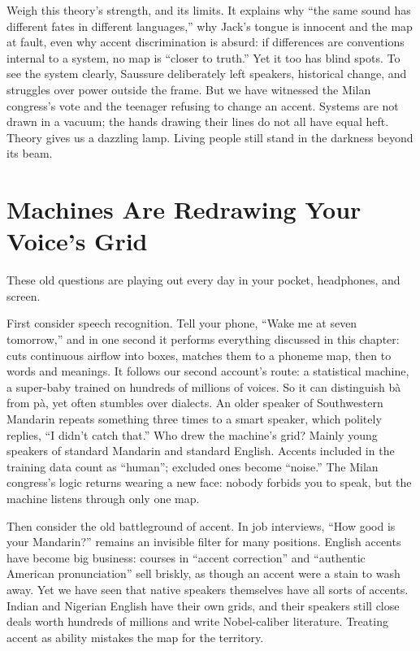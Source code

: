 Weigh this theory's strength, and its limits. It explains why ``the same sound has different fates in different languages,'' why Jack's tongue is innocent and the map at fault, even why accent discrimination is absurd: if differences are conventions internal to a system, no map is ``closer to truth.'' Yet it too has blind spots. To see the system clearly, Saussure deliberately left speakers, historical change, and struggles over power outside the frame. But we have witnessed the Milan congress's vote and the teenager refusing to change an accent. Systems are not drawn in a vacuum; the hands drawing their lines do not all have equal heft. Theory gives us a dazzling lamp. Living people still stand in the darkness beyond its beam.

\section{Machines Are Redrawing Your Voice's Grid}
These old questions are playing out every day in your pocket, headphones, and screen.

First consider speech recognition. Tell your phone, ``Wake me at seven tomorrow,'' and in one second it performs everything discussed in this chapter: cuts continuous airflow into boxes, matches them to a phoneme map, then to words and meanings. It follows our second account's route: a statistical machine, a super-baby trained on hundreds of millions of voices. So it can distinguish bà from pà, yet often stumbles over dialects. An older speaker of Southwestern Mandarin repeats something three times to a smart speaker, which politely replies, ``I didn't catch that.'' Who drew the machine's grid? Mainly young speakers of standard Mandarin and standard English. Accents included in the training data count as ``human''; excluded ones become ``noise.'' The Milan congress's logic returns wearing a new face: nobody forbids you to speak, but the machine listens through only one map.

Then consider the old battleground of accent. In job interviews, ``How good is your Mandarin?'' remains an invisible filter for many positions. English accents have become big business: courses in ``accent correction'' and ``authentic American pronunciation'' sell briskly, as though an accent were a stain to wash away. Yet we have seen that native speakers themselves have all sorts of accents. Indian and Nigerian English have their own grids, and their speakers still close deals worth hundreds of millions and write Nobel-caliber literature. Treating accent as ability mistakes the map for the territory.

